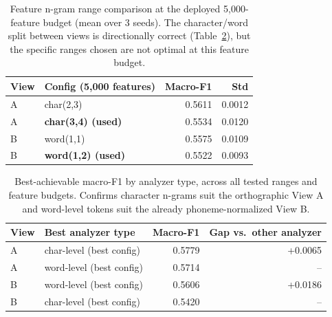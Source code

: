 \begin{table}[H]
\centering
\begin{tabular}{llrr}
\toprule
\textbf{View} & \textbf{Config (5{,}000 features)} & \textbf{Macro-F1} & \textbf{Std} \\
\midrule
A & char(2,3)                    & 0.5611 & 0.0012 \\
A & \textbf{char(3,4) (used)}    & 0.5534 & 0.0120 \\
\midrule
B & word(1,1)                    & 0.5575 & 0.0109 \\
B & \textbf{word(1,2) (used)}    & 0.5522 & 0.0093 \\
\bottomrule
\end{tabular}
\caption{Feature n-gram range comparison at the deployed 5{,}000-feature
budget (mean over 3 seeds). The character/word split between views is
directionally correct (Table~\ref{tab:ngram-direction}), but the specific
ranges chosen are not optimal at this feature budget.}
\label{tab:ngram-budget}
\end{table}

\begin{table}[H]
\centering
\begin{tabular}{llrr}
\toprule
\textbf{View} & \textbf{Best analyzer type} & \textbf{Macro-F1} & \textbf{Gap vs.\ other analyzer} \\
\midrule
A & char-level (best config) & 0.5779 & +0.0065 \\
A & word-level (best config)  & 0.5714 & -- \\
\midrule
B & word-level (best config)  & 0.5606 & +0.0186 \\
B & char-level (best config)  & 0.5420 & -- \\
\bottomrule
\end{tabular}
\caption{Best-achievable macro-F1 by analyzer type, across all tested
ranges and feature budgets. Confirms character n-grams suit the orthographic
View A and word-level tokens suit the already phoneme-normalized View B.}
\label{tab:ngram-direction}
\end{table}


